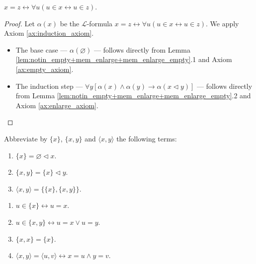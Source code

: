 \begin{theorem}
    \label{thm:exten_prop}
    \leanok
    $x=z \leftrightarrow \forall u (u \in x \leftrightarrow u \in z)$.
\end{theorem}

\begin{proof}
    \leanok
    Let $\alpha (x)$ be the $\mathcal{L}$-formula
    $x=z \leftrightarrow \forall u (u \in x \leftrightarrow u \in z)$.
    We apply Axiom \ref{ax:induction_axiom}.
    \begin{itemize}
        \item The base case — $\alpha (\varnothing)$ — follows directly from Lemma 
        \ref{lem:notin_empty+mem_enlarge+mem_enlarge_empty}.1 and Axiom \ref{ax:empty_axiom}.
        \item The induction step — 
        $\forall y[\alpha(x) \land \alpha(y) \rightarrow \alpha(x \lhd y)]$ — 
        follows directly from Lemma \ref{lem:notin_empty+mem_enlarge+mem_enlarge_empty}.2 and 
        Axiom \ref{ax:enlarge_axiom}.
    \end{itemize}
\end{proof}

\begin{definition}
    \label{def:singleton+pair}
    \leanok
    Abbreviate by $\{x\}$, $\{x,y\}$ and $\langle x,y\rangle$ the following terms:
    \begin{enumerate}
        \item $\{x\} = \varnothing \lhd x$.
        \item $\{x,y\} = \{x\} \lhd y$.
        \item $\langle x,y\rangle = \{\{x\}, \{x,y\}\}$.
    \end{enumerate}
\end{definition}

\begin{lemma}
    \label{lem:mem_singleton+...+pair_inj}
    \leanok
    \leavevmode
    \begin{enumerate}
        \item $ u\in \{x\} \leftrightarrow u = x$.
        \item $u \in \{x,y\}\leftrightarrow u=x \lor u=y$.
        \item $\{x,x\} = \{x\}$.
        \item $\langle x,y\rangle = \langle u,v\rangle \leftrightarrow x=u \land y=v$.
    \end{enumerate}
\end{lemma}

